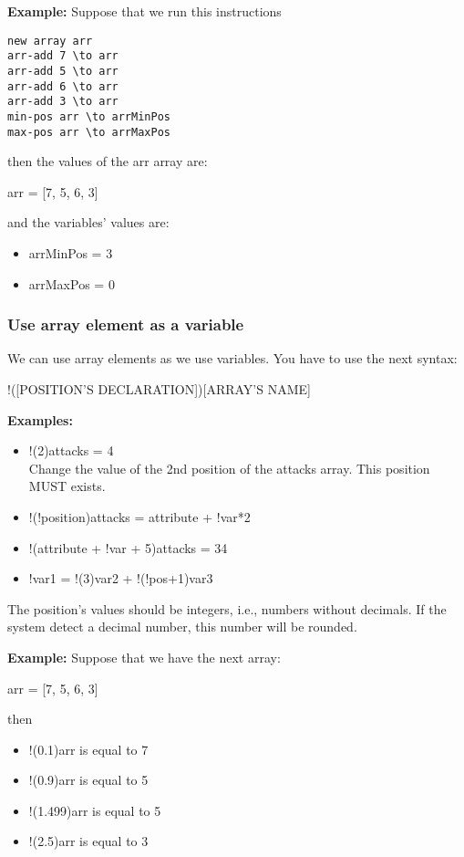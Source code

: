 \documentclass[11pt,a4paper,openright,oneside]{book}
\newenvironment{exs}
{
  \setlength{\parindent}{0cm}
  \large \textbf{Examples:} \normalsize
}
{}
\newenvironment{ex}
{
  \setlength{\parindent}{0cm}
  \large \textbf{Example:} \normalsize 
}
{}
\begin{document}
\begin{ex} Suppose that we run this instructions
  \begin{lstlisting}
new array arr
arr-add 7 \to arr
arr-add 5 \to arr
arr-add 6 \to arr
arr-add 3 \to arr
min-pos arr \to arrMinPos
max-pos arr \to arrMaxPos
  \end{lstlisting}
  then the values of the \textsf{arr} array are:
  \begin{center} \textsf{arr = [7, 5, 6, 3]}\end{center}
  and the variables' values are:
  \begin{itemize}
    \item \textsf{arrMinPos = 3}
    \item \textsf{arrMaxPos = 0}
  \end{itemize}
\end{ex}

\subsubsection{Use array element as a variable}
We can use array elements as we use variables. You have to use the next syntax:
\begin{center} \textsf{!(\textsc{\scriptsize[POSITION'S DECLARATION]})\textsc{\scriptsize[ARRAY'S NAME]}} \normalsize \end{center}
\begin{exs} 
  \begin{itemize}
    \item \textsf{!(2)attacks = 4} \\
    Change the value of the 2nd position of the \textsf{attacks} array. This position MUST exists.
    \item \textsf{!(!position)attacks = attribute + !var*2} \\
    \item \textsf{!(attribute + !var + 5)attacks = 34} \\
    \item \textsf{!var1 = !(3)var2 + !(!pos+1)var3} \\
  \end{itemize}
\end{exs}

The position's values should be integers, i.e., numbers without decimals. If the system detect a decimal number, this number will be rounded.

\begin{ex} Suppose that we have the next array:
  \begin{center} \textsf{arr = [7, 5, 6, 3]}\end{center}
  then
  \begin{itemize}
    \item \textsf{!(0.1)arr} is equal to \textsf{7}
    \item \textsf{!(0.9)arr} is equal to \textsf{5}
    \item \textsf{!(1.499)arr} is equal to \textsf{5}
    \item \textsf{!(2.5)arr} is equal to \textsf{3}
  \end{itemize} 
\end{ex}
\end{document}
